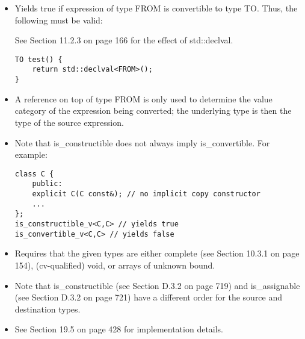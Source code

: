 \begin{itemize}
\item
Yields true if expression of type FROM is convertible to type TO. Thus, the following must be valid:

\begin{tcolorbox}[colback=webgreen!5!white,colframe=webgreen!75!black]
\hspace*{0.75cm}See Section 11.2.3 on page 166 for the effect of std::declval.
\end{tcolorbox}

\begin{lstlisting}[style=styleCXX]
TO test() {
	return std::declval<FROM>();
}
\end{lstlisting}

\item
A reference on top of type FROM is only used to determine the value category of the expression being converted; the underlying type is then the type of the source expression.

\item
Note that is\_constructible does not always imply is\_convertible. For example:

\begin{lstlisting}[style=styleCXX]
class C {
	public:
	explicit C(C const&); // no implicit copy constructor
	...
};
is_constructible_v<C,C> // yields true
is_convertible_v<C,C> // yields false
\end{lstlisting}

\item
Requires that the given types are either complete (see Section 10.3.1 on page 154), (cv-qualified) void, or arrays of unknown bound.

\item
Note that is\_constructible (see Section D.3.2 on page 719) and is\_assignable (see Section D.3.2 on page 721) have a different order for the source and destination types.

\item
See Section 19.5 on page 428 for implementation details.
\end{itemize}
